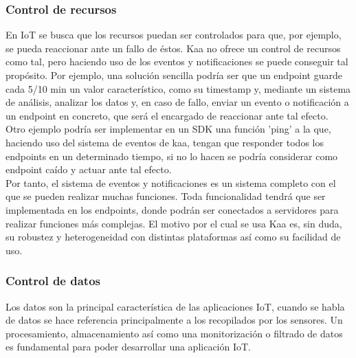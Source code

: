 \documentclass[12pt, twoside]{book}
\begin{document}
\subsubsection*{Control de recursos}
En IoT se busca que los recursos puedan ser controlados para que, por ejemplo, se pueda reaccionar ante un fallo de éstos. Kaa no ofrece un control de recursos como tal, pero haciendo uso de los eventos y notificaciones se puede conseguir tal propósito. Por ejemplo, una solución sencilla podría ser que un endpoint guarde cada 5/10 min un valor característico, como su timestamp y, mediante un sistema de análisis, analizar los datos y, en caso de fallo, enviar un evento o notificación a un endpoint en concreto, que será el encargado de reaccionar ante tal efecto.\\
Otro ejemplo podría ser implementar en un SDK una función 'ping' a la que, haciendo uso del sistema de eventos de kaa, tengan que responder todos los endpoints en un determinado tiempo, si no lo hacen se podría considerar como endpoint caído y actuar ante tal efecto.\\
Por tanto, el sistema de eventos y notificaciones es un sistema completo con el que se pueden realizar muchas funciones. Toda funcionalidad tendrá que ser implementada en los endpoints, donde podrán ser conectados a servidores para realizar funciones más complejas. El motivo por el cual se usa Kaa es, sin duda, su robustez y heterogeneidad con distintas plataformas así como su facilidad de uso. 


\subsubsection*{Control de datos}
Los datos son la principal característica de las aplicaciones IoT, cuando se habla de datos se hace referencia principalmente a los recopilados por los sensores. Un procesamiento, almacenamiento así como una monitorización o filtrado de datos es fundamental para poder desarrollar una aplicación IoT. \\ 
\end{document}
